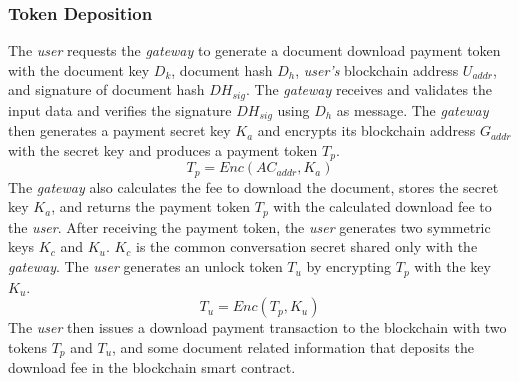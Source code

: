 \subsubsection{Token Deposition}
The {\it user} requests the {\it gateway} to generate a document download payment token with the document key $D_k$, document hash $D_h$, {\it user's} blockchain address $U_{addr}$, and signature of document hash $DH_{sig}$. The {\it gateway} receives and validates the input data and verifies the signature $DH_{sig}$ using $D_{h}$ as message. The {\it gateway} then generates a payment secret key $K_a$ and encrypts its blockchain address $G_{addr}$ with the secret key and produces a payment token $T_{p}$. 
\begin{equation}
\label{eq-d-1}
T_p = Enc (AC_{addr}, K_a)
\end{equation}
The {\it gateway} also calculates the fee to download the document, stores the secret key $K_a$, and returns the payment token $T_p$ with the calculated download fee to the {\it user}.
After receiving the payment token, the {\it user} generates two symmetric keys $K_c$ and $K_u$. $K_c$ is the common conversation secret shared only with the {\it gateway}. The {\it user} generates an unlock token $T_u$ by encrypting $T_p$ with the key $K_u$.
\begin{equation}
\label{eq-d-2}
T_u = Enc (T_p, K_u)
\end{equation}
The {\it user} then issues a download payment transaction to the blockchain with two tokens $T_p$ and $T_u$, and some document related information that deposits the download fee in the blockchain smart contract.


